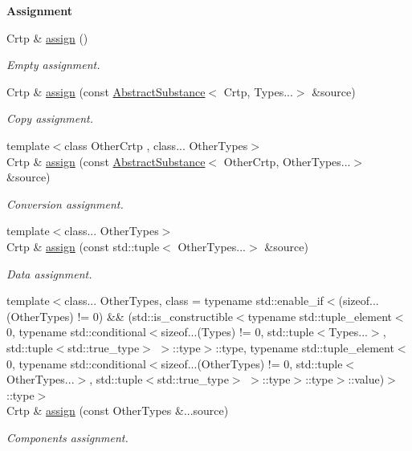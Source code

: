 \begin{Indent}{\bf Assignment}\par
\begin{DoxyCompactItemize}
\item 
Crtp \& \hyperlink{classmagrathea_1_1AbstractSubstance_af4a9f8814bd9954988af0aea0d8f73cc}{assign} ()
\begin{DoxyCompactList}\small\item\em Empty assignment. \end{DoxyCompactList}\item 
Crtp \& \hyperlink{classmagrathea_1_1AbstractSubstance_acc00ec246c7185ece64db290e4a31562}{assign} (const \hyperlink{classmagrathea_1_1AbstractSubstance}{Abstract\-Substance}$<$ Crtp, Types...$>$ \&source)
\begin{DoxyCompactList}\small\item\em Copy assignment. \end{DoxyCompactList}\item 
{\footnotesize template$<$class Other\-Crtp , class... Other\-Types$>$ }\\Crtp \& \hyperlink{classmagrathea_1_1AbstractSubstance_af3c57609641ed8e4822853e4da7def6e}{assign} (const \hyperlink{classmagrathea_1_1AbstractSubstance}{Abstract\-Substance}$<$ Other\-Crtp, Other\-Types...$>$ \&source)
\begin{DoxyCompactList}\small\item\em Conversion assignment. \end{DoxyCompactList}\item 
{\footnotesize template$<$class... Other\-Types$>$ }\\Crtp \& \hyperlink{classmagrathea_1_1AbstractSubstance_a0b1a0721dacd07507a00044e2adeb8a4}{assign} (const std\-::tuple$<$ Other\-Types...$>$ \&source)
\begin{DoxyCompactList}\small\item\em Data assignment. \end{DoxyCompactList}\item 
{\footnotesize template$<$class... Other\-Types, class  = typename std\-::enable\-\_\-if$<$(sizeof...(\-Other\-Types) != 0) \&\& (std\-::is\-\_\-constructible$<$typename std\-::tuple\-\_\-element$<$0, typename std\-::conditional$<$sizeof...(\-Types) != 0, std\-::tuple$<$\-Types...$>$, std\-::tuple$<$std\-::true\-\_\-type$>$ $>$\-::type$>$\-::type, typename std\-::tuple\-\_\-element$<$0, typename std\-::conditional$<$sizeof...(\-Other\-Types) != 0, std\-::tuple$<$\-Other\-Types...$>$, std\-::tuple$<$std\-::true\-\_\-type$>$ $>$\-::type$>$\-::type$>$\-::value)$>$\-::type$>$ }\\Crtp \& \hyperlink{classmagrathea_1_1AbstractSubstance_ab0a5b8f4482c9c374c6fd0e817c8891d}{assign} (const Other\-Types \&...source)
\begin{DoxyCompactList}\small\item\em Components assignment. \end{DoxyCompactList}\end{DoxyCompactItemize}
\end{Indent}
